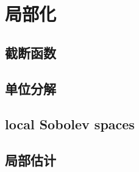 \section{局部化}
\label{b1:sec:2204}


\subsection{截断函数}
\label{b1:subsec:220401}

\subsection{单位分解}
\label{b1:subsec:220402}

\subsection{local Sobolev spaces}
\label{b1:subsec:220403}

\subsection{局部估计}
\label{b1:subsec:220404}


